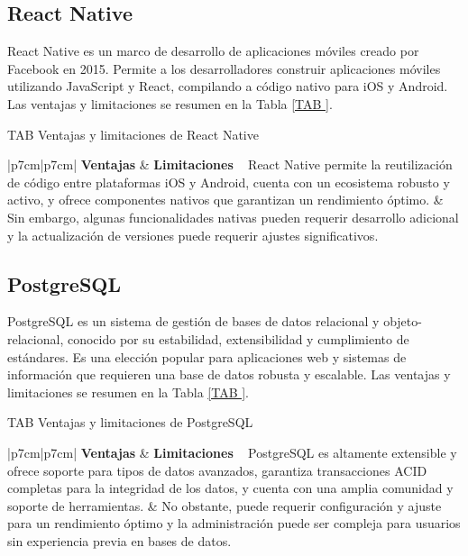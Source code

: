 \subsection{React Native}

React Native es un marco de desarrollo de aplicaciones móviles creado por Facebook en 2015. Permite a los desarrolladores construir aplicaciones móviles utilizando JavaScript y React, compilando a código nativo para iOS y Android. Las ventajas y limitaciones se resumen en la Tabla \ref{TAB
}.

\begin{table}[React Native]{TAB
}{Ventajas y limitaciones de React Native}
\begin{tabular}{|p{7cm}|p{7cm}|}
\hline
\textbf{Ventajas} & \textbf{Limitaciones} \
\hline
React Native permite la reutilización de código entre plataformas iOS y Android, cuenta con un ecosistema robusto y activo, y ofrece componentes nativos que garantizan un rendimiento óptimo. & Sin embargo, algunas funcionalidades nativas pueden requerir desarrollo adicional y la actualización de versiones puede requerir ajustes significativos. \
\hline
\end{tabular}
\end{table}

\subsection{PostgreSQL}

PostgreSQL es un sistema de gestión de bases de datos relacional y objeto-relacional, conocido por su estabilidad, extensibilidad y cumplimiento de estándares. Es una elección popular para aplicaciones web y sistemas de información que requieren una base de datos robusta y escalable. Las ventajas y limitaciones se resumen en la Tabla \ref{TAB
}.

\begin{table}[PostgreSQL]{TAB
}{Ventajas y limitaciones de PostgreSQL}
\begin{tabular}{|p{7cm}|p{7cm}|}
\hline
\textbf{Ventajas} & \textbf{Limitaciones} \
\hline
PostgreSQL es altamente extensible y ofrece soporte para tipos de datos avanzados, garantiza transacciones ACID completas para la integridad de los datos, y cuenta con una amplia comunidad y soporte de herramientas. & No obstante, puede requerir configuración y ajuste para un rendimiento óptimo y la administración puede ser compleja para usuarios sin experiencia previa en bases de datos. \
\hline
\end{tabular}
\end{table}

